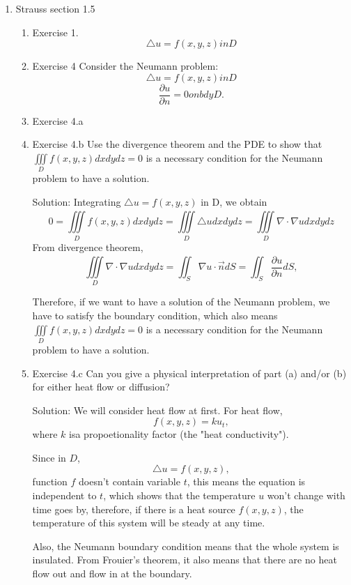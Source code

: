 \documentclass{article}
\begin{document}
\begin{enumerate}
\begin{enumerate}
		

	\end{enumerate}
\item Strauss section 1.5
	\begin{enumerate}
		\item Exercise 1.
		\[\triangle u = f(x,y,z) in D\]		
		
		\item Exercise 4 Consider the Neumann problem: \[\triangle u = f(x,y,z) in D\]
		\[\frac{\partial u}{\partial n}=0 on bdy D.\]
		\item  Exercise 4.a
		\item Exercise 4.b Use the divergence theorem and the PDE to show that $ \iiint\limits_{D}^{} f(x,y,z)dxdydz=0$ is a necessary condition for the Neumann problem to have a solution.
		
		Solution: Integrating $\triangle u = f(x,y,z)$ in D, we obtain
		\[0= \iiint\limits_{D}^{} f(x,y,z)dxdydz=\iiint\limits_{D}^{} \triangle u dxdydz=\iiint\limits_{D}^{} \nabla \cdot \nabla u dxdydz
		\]
		From divergence theorem,
		\[\iiint\limits_{D}^{} \nabla \cdot \nabla u dxdydz=\iint_{S}^{} \nabla u \cdot \vec{n}dS=\iint_{S}^{} \frac{\partial u}{\partial n}dS,
			\]

			Therefore, if we want to have a solution of the Neumann problem, we have to satisfy the boundary condition, which also means $ \iiint\limits_{D}^{} f(x,y,z)dxdydz=0$ is a necessary condition for the Neumann problem to have a solution.
		\item Exercise 4.c Can you give a physical interpretation of part (a) and/or (b) for either heat flow or diffusion?
		
		Solution: We will consider heat flow at first. For heat flow, \[f(x,y,z)=ku_{t},\]
		where $k$ isa propoetionality factor (the "heat conductivity").
        
		Since in $D$, \[\triangle u = f(x,y,z),\] function $f$ doesn't contain variable $t$, this means the equation is independent to $t$, which shows that the temperature $u$ won't change with time goes by, therefore, if there is a heat source $f(x,y,z)$, the temperature of this system will be steady at any time.

		Also, the Neumann boundary condition means that the whole system is insulated. From Frouier's theorem, it also means that there are no heat flow out and flow in at the boundary.

		
	\end{enumerate}
\end{enumerate}
\end{document}
